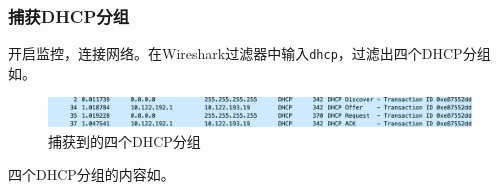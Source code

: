 \documentclass[lang=cn,11pt,a4paper,cite=authornum]{paper}
\begin{document}
\subsubsection{捕获DHCP分组}

开启监控，连接网络。在Wireshark过滤器中输入\texttt{dhcp}，过滤出四个DHCP分组如。

\begin{figure}[htbp]

    \centering\includegraphics[width=\textwidth]{./Images/DHCPS.png}

    \caption{捕获到的四个DHCP分组\label{fig:dhcps}}

\end{figure}

四个DHCP分组的内容如。
\end{document}
